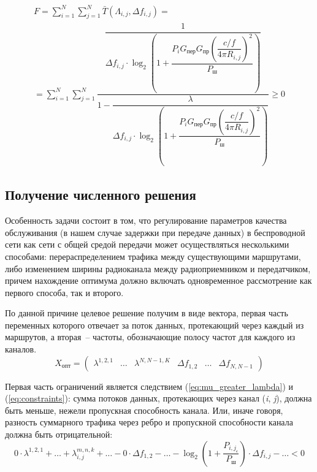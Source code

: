 \documentclass[14pt,a4paper,titlepage]{extarticle}
\begin{document}
\begin{multline}
F = \sum\limits_{i=1}^N \sum\limits_{j=1}^N \bar{T}(\Lambda_{i,j}, \Delta f_{i,j}) = \\ = \sum\limits_{i=1}^N \sum\limits_{j=1}^N \dfrac{\dfrac{1}{\Delta f_{i,j} \cdot \log_2\left(1 + \dfrac{P_i G_{\textit{пер}} G_{\textit{пр}} \left(\dfrac{c\slash f}{4 \pi R_{i,j}}\right)^2}{P_{\text{ш}}}\right)}}{1-\dfrac{\lambda}{\Delta f_{i,j} \cdot \log_2\left(1 + \dfrac{P_i G_{\textit{пер}} G_{\textit{пр}} \left(\dfrac{c\slash f}{4 \pi R_{i,j}}\right)^2}{P_{\text{ш}}}\right)}} \geq 0
\end{multline}

\subsection{Получение численного решения}
Особенность задачи состоит в том, что регулирование параметров качества обслуживания (в нашем случае задержки при передаче данных) в беспроводной сети как сети с общей средой передачи может осуществляться несколькими способами: перераспределением трафика между существующими маршрутами, либо изменением ширины радиоканала между радиоприемником и передатчиком, причем нахождение оптимума должно включать одновременное рассмотрение как первого способа, так и второго.

По данной причине целевое решение получим в виде вектора, первая часть переменных которого отвечает за поток данных, протекающий через каждый из маршрутов, а вторая~-- частоты, обозначающие полосу частот для каждого из каналов. 
\begin{equation}
X_{\text{опт}} = \begin{pmatrix} \lambda^{1,2,1} &\ldots & \lambda^{N,N-1,K} & \Delta f_{1,2} & \ldots & \Delta f_{N,N-1}\end{pmatrix}
\end{equation}

Первая часть ограничений является следствием (\ref{eq:mu_greater_lambda}) и (\ref{eq:constraints}): сумма потоков данных, протекающих через канал (\textit{i}, \textit{j}), должна быть меньше, нежели пропускная способность канала. Или, иначе говоря, разность суммарного трафика через ребро и пропускной способности канала должна быть отрицательной:
\begin{equation}
\label{eq:restrictions_first}
0 \cdot \lambda^{1,2,1} + \ldots + \lambda_{i,j}^{m,n,k} + \ldots - 0 \cdot \Delta f_{1,2} - \ldots - \log_2\left(1 + \dfrac{P_{i,j_{\text{с}}}}{P_{\text{ш}}}\right) \cdot \Delta f_{i,j} - \ldots < 0
\end{equation}
\end{document}

